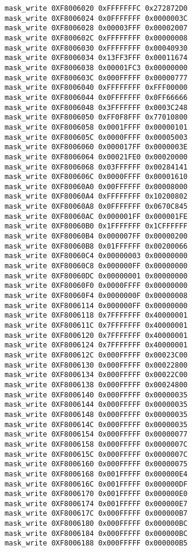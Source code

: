 \begin{lstlisting}
    mask_write 0XF8006020 0xFFFFFFFC 0x272872D0
    mask_write 0XF8006024 0x0FFFFFFF 0x0000003C
    mask_write 0XF8006028 0x00003FFF 0x00002007
    mask_write 0XF800602C 0xFFFFFFFF 0x00000008
    mask_write 0XF8006030 0xFFFFFFFF 0x00040930
    mask_write 0XF8006034 0x13FF3FFF 0x00011674
    mask_write 0XF8006038 0x00001FC3 0x00000000
    mask_write 0XF800603C 0x000FFFFF 0x00000777
    mask_write 0XF8006040 0xFFFFFFFF 0xFFF00000
    mask_write 0XF8006044 0x0FFFFFFF 0x0FF66666
    mask_write 0XF8006048 0x3FFFFFFF 0x0003C248
    mask_write 0XF8006050 0xFF0F8FFF 0x77010800
    mask_write 0XF8006058 0x0001FFFF 0x00000101
    mask_write 0XF800605C 0x0000FFFF 0x00005003
    mask_write 0XF8006060 0x000017FF 0x0000003E
    mask_write 0XF8006064 0x00021FE0 0x00020000
    mask_write 0XF8006068 0x03FFFFFF 0x00284141
    mask_write 0XF800606C 0x0000FFFF 0x00001610
    mask_write 0XF80060A0 0x00FFFFFF 0x00008000
    mask_write 0XF80060A4 0xFFFFFFFF 0x10200802
    mask_write 0XF80060A8 0x0FFFFFFF 0x0670C845
    mask_write 0XF80060AC 0x000001FF 0x000001FE
    mask_write 0XF80060B0 0x1FFFFFFF 0x1CFFFFFF
    mask_write 0XF80060B4 0x000007FF 0x00000200
    mask_write 0XF80060B8 0x01FFFFFF 0x00200066
    mask_write 0XF80060C4 0x00000003 0x00000000
    mask_write 0XF80060C8 0x000000FF 0x00000000
    mask_write 0XF80060DC 0x00000001 0x00000000
    mask_write 0XF80060F0 0x0000FFFF 0x00000000
    mask_write 0XF80060F4 0x0000000F 0x00000008
    mask_write 0XF8006114 0x000000FF 0x00000000
    mask_write 0XF8006118 0x7FFFFFFF 0x40000001
    mask_write 0XF800611C 0x7FFFFFFF 0x40000001
    mask_write 0XF8006120 0x7FFFFFFF 0x40000001
    mask_write 0XF8006124 0x7FFFFFFF 0x40000001
    mask_write 0XF800612C 0x000FFFFF 0x00023C00
    mask_write 0XF8006130 0x000FFFFF 0x00022800
    mask_write 0XF8006134 0x000FFFFF 0x00022C00
    mask_write 0XF8006138 0x000FFFFF 0x00024800
    mask_write 0XF8006140 0x000FFFFF 0x00000035
    mask_write 0XF8006144 0x000FFFFF 0x00000035
    mask_write 0XF8006148 0x000FFFFF 0x00000035
    mask_write 0XF800614C 0x000FFFFF 0x00000035
    mask_write 0XF8006154 0x000FFFFF 0x00000077
    mask_write 0XF8006158 0x000FFFFF 0x0000007C
    mask_write 0XF800615C 0x000FFFFF 0x0000007C
    mask_write 0XF8006160 0x000FFFFF 0x00000075
    mask_write 0XF8006168 0x001FFFFF 0x000000E4
    mask_write 0XF800616C 0x001FFFFF 0x000000DF
    mask_write 0XF8006170 0x001FFFFF 0x000000E0
    mask_write 0XF8006174 0x001FFFFF 0x000000E7
    mask_write 0XF800617C 0x000FFFFF 0x000000B7
    mask_write 0XF8006180 0x000FFFFF 0x000000BC
    mask_write 0XF8006184 0x000FFFFF 0x000000BC
    mask_write 0XF8006188 0x000FFFFF 0x000000B5

\end{lstlisting}

